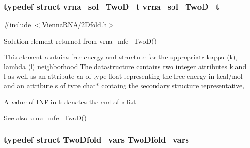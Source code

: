 \subsubsection[{\texorpdfstring{vrna\+\_\+sol\+\_\+\+Two\+D\+\_\+t}{vrna_sol_TwoD_t}}]{\setlength{\rightskip}{0pt plus 5cm}typedef struct {\bf vrna\+\_\+sol\+\_\+\+Two\+D\+\_\+t}  {\bf vrna\+\_\+sol\+\_\+\+Two\+D\+\_\+t}}\hypertarget{group__kl__neighborhood__mfe_ga6a81a58268d250309712549a3fa0aab2}{}\label{group__kl__neighborhood__mfe_ga6a81a58268d250309712549a3fa0aab2}


{\ttfamily \#include $<$\hyperlink{2Dfold_8h}{Vienna\+R\+N\+A/2\+Dfold.\+h}$>$}



Solution element returned from \hyperlink{group__kl__neighborhood__mfe_ga243c288b463147352829df04de6a2f77}{vrna\+\_\+mfe\+\_\+\+Two\+D()} 

This element contains free energy and structure for the appropriate kappa (k), lambda (l) neighborhood The datastructure contains two integer attributes \textquotesingle{}k\textquotesingle{} and \textquotesingle{}l\textquotesingle{} as well as an attribute \textquotesingle{}en\textquotesingle{} of type float representing the free energy in kcal/mol and an attribute \textquotesingle{}s\textquotesingle{} of type char$\ast$ containg the secondary structure representative,

A value of \hyperlink{energy__const_8h_a12c2040f25d8e3a7b9e1c2024c618cb6}{I\+NF} in k denotes the end of a list

\begin{DoxySeeAlso}{See also}
\hyperlink{group__kl__neighborhood__mfe_ga243c288b463147352829df04de6a2f77}{vrna\+\_\+mfe\+\_\+\+Two\+D()} 
\end{DoxySeeAlso}
\subsubsection[{\texorpdfstring{Two\+Dfold\+\_\+vars}{TwoDfold_vars}}]{\setlength{\rightskip}{0pt plus 5cm}typedef struct {\bf Two\+Dfold\+\_\+vars}  {\bf Two\+Dfold\+\_\+vars}}\hypertarget{group__kl__neighborhood__mfe_gaf4f514010a14f9d59d850742b3e96954}{}\label{group__kl__neighborhood__mfe_gaf4f514010a14f9d59d850742b3e96954}


